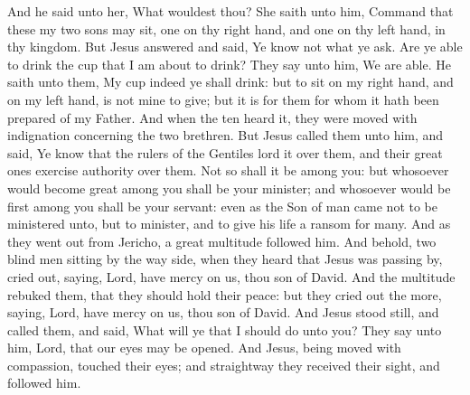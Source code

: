 And he said unto her, What wouldest thou? She saith unto him, Command that these my two sons may sit, one on thy right hand, and one on thy left hand, in thy kingdom. But Jesus answered and said, Ye know not what ye ask. Are ye able to drink the cup that I am about to drink? They say unto him, We are able. He saith unto them, My cup indeed ye shall drink: but to sit on my right hand, and on my left hand, is not mine to give; but it is for them for whom it hath been prepared of my Father. And when the ten heard it, they were moved with indignation concerning the two brethren. But Jesus called them unto him, and said, Ye know that the rulers of the Gentiles lord it over them, and their great ones exercise authority over them. Not so shall it be among you: but whosoever would become great among you shall be your minister; and whosoever would be first among you shall be your servant: even as the Son of man came not to be ministered unto, but to minister, and to give his life a ransom for many.  And as they went out from Jericho, a great multitude followed him. And behold, two blind men sitting by the way side, when they heard that Jesus was passing by, cried out, saying, Lord, have mercy on us, thou son of David. And the multitude rebuked them, that they should hold their peace: but they cried out the more, saying, Lord, have mercy on us, thou son of David. And Jesus stood still, and called them, and said, What will ye that I should do unto you? They say unto him, Lord, that our eyes may be opened. And Jesus, being moved with compassion, touched their eyes; and straightway they received their sight, and followed him. 

